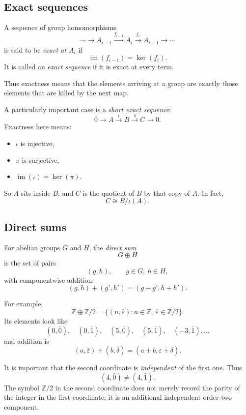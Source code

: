 \documentclass[12pt,a4paper]{article}
\theoremstyle{notespace}
\begin{document}
\subsection{Exact sequences}

A sequence of group homomorphisms
\[
\cdots \longrightarrow A_{i-1}\xrightarrow{f_{i-1}} A_i\xrightarrow{f_i} A_{i+1}\longrightarrow \cdots
\]
is said to be \emph{exact at \(A_i\)} if
\[
\operatorname{im}(f_{i-1})=\ker(f_i).
\]
It is called an \emph{exact sequence} if it is exact at every term.

Thus exactness means that the elements arriving at a group are exactly those elements that are killed by the next map.

A particularly important case is a \emph{short exact sequence}:
\[
0\longrightarrow A\xrightarrow{\iota} B\xrightarrow{\pi} C\longrightarrow 0.
\]
Exactness here means:

\begin{itemize}
	\item \(\iota\) is injective,
	\item \(\pi\) is surjective,
	\item \(\operatorname{im}(\iota)=\ker(\pi)\).
\end{itemize}

So \(A\) sits inside \(B\), and \(C\) is the quotient of \(B\) by that copy of \(A\). In fact,
\[
C\cong B/\iota(A).
\]

\subsection{Direct sums}

For abelian groups \(G\) and \(H\), the \emph{direct sum}
\[
G\oplus H
\]
is the set of pairs
\[
(g,h),\qquad g\in G,\ h\in H,
\]
with componentwise addition:
\[
(g,h)+(g',h')=(g+g',h+h').
\]

For example,
\[
\mathbb Z\oplus \mathbb Z/2
=
\{(n,\bar\varepsilon): n\in \mathbb Z,\ \bar\varepsilon\in \mathbb Z/2\}.
\]
Its elements look like
\[
(0,\bar 0),\quad (0,\bar 1),\quad (5,\bar 0),\quad (5,\bar 1),\quad (-3,\bar 1),\dots
\]
and addition is
\[
(a,\bar\varepsilon)+(b,\bar\delta)=(a+b,\overline{\varepsilon+\delta}).
\]

It is important that the second coordinate is \emph{independent} of the first one. Thus
\[
(4,\bar 0)\neq (4,\bar 1).
\]
The symbol \(\mathbb Z/2\) in the second coordinate does not merely record the parity of the integer in the first coordinate; it is an additional independent order-two component.
\end{document}
